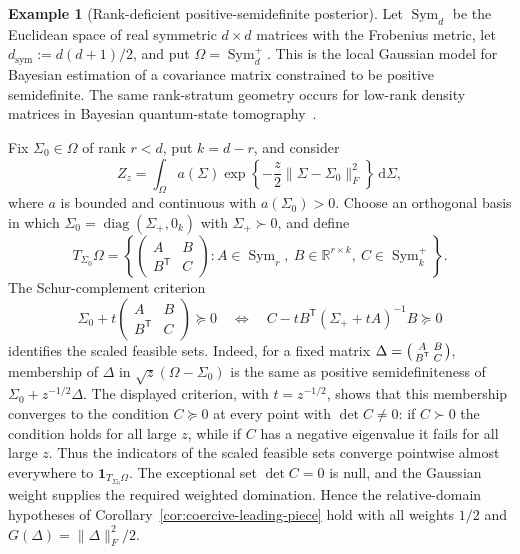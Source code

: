 \documentclass[11pt]{amsart}
\numberwithin{equation}{section}
\theoremstyle{definition}
\newtheorem{example}[theorem]{Example}
\theoremstyle{remark}
\DeclareMathOperator{\Sym}{Sym}
\DeclareMathOperator{\diag}{diag}
\newcommand{\R}{\mathbb{R}}
\newcommand{\ind}{\mathbf{1}}
\newcommand{\dd}{\,\mathrm{d}}
\begin{document}
\begin{example}[Rank-deficient positive-semidefinite posterior]
\label{ex:psd-posterior}
Let $\Sym_d$ be the Euclidean space of real symmetric $d\times d$
matrices with the Frobenius metric, let $d_{\mathrm{sym}}:=d(d+1)/2$, and put
$\Omega=\Sym_d^+$.  This is the local Gaussian model for Bayesian
estimation of a covariance matrix constrained to be positive semidefinite.
The same rank-stratum geometry occurs for low-rank density matrices in
Bayesian quantum-state tomography~\cite{SixRouchon}.

Fix $\Sigma_0\in\Omega$ of rank $r<d$, put $k=d-r$, and consider
\[
 Z_z=\int_\Omega a(\Sigma)
 \exp\!\left\{-\frac z2\|\Sigma-\Sigma_0\|_F^2\right\}\dd\Sigma,
\]
where $a$ is bounded and continuous with $a(\Sigma_0)>0$.  Choose an
orthogonal basis in which $\Sigma_0=\diag(\Sigma_+,0_k)$ with
$\Sigma_+\succ0$, and define
\[
 T_{\Sigma_0}\Omega
 =\left\{
 \begin{pmatrix}A&B\\B^{\mathsf T}&C\end{pmatrix}:
 A\in\Sym_r,\ B\in\R^{r\times k},\ C\in\Sym_k^+
 \right\}.
\]
The Schur-complement criterion
\[
 \Sigma_0+t\begin{pmatrix}A&B\\B^{\mathsf T}&C\end{pmatrix}\succeq0
 \quad\Longleftrightarrow\quad
 C-tB^{\mathsf T}(\Sigma_++tA)^{-1}B\succeq0
\]
identifies the scaled feasible sets.  Indeed, for a fixed matrix
$\Delta=\begin{psmallmatrix}A&B\\B^{\mathsf T}&C\end{psmallmatrix}$, membership of
$\Delta$ in $\sqrt z(\Omega-\Sigma_0)$ is the same as positive semidefiniteness of
$\Sigma_0+z^{-1/2}\Delta$.  The displayed criterion, with $t=z^{-1/2}$, shows that
this membership converges to the condition $C\succeq0$ at every point with
$\det C\ne0$: if $C\succ0$ the condition holds for all large $z$, while if
$C$ has a negative eigenvalue it fails for all large $z$.  Thus the indicators
of the scaled feasible sets converge pointwise almost everywhere to
$\ind_{T_{\Sigma_0}\Omega}$.  The exceptional set $\det C=0$ is null, and the
Gaussian weight supplies the required weighted domination.  Hence the
relative-domain hypotheses of Corollary~\ref{cor:coercive-leading-piece} hold with all
weights $1/2$ and $G(\Delta)=\|\Delta\|_F^2/2$.


\end{example}
\end{document}
